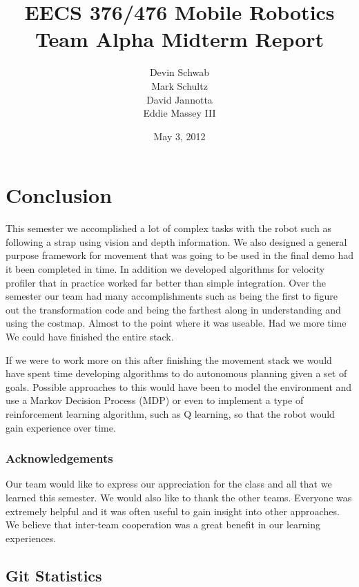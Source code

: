 \documentclass[10pt,letterpaper,draft]{report}
\author{Devin Schwab\\
  Mark Schultz\\
  David Jannotta\\
  Eddie Massey III}
\title{EECS 376/476 Mobile Robotics\\
  Team Alpha Midterm Report} \date{May 3, 2012}
\begin{document}

\listoftodos
\maketitle

\tableofcontents
\newpage









\part{Conclusion}

This semester we accomplished a lot of complex tasks with the robot such as following a strap using vision and depth information. We also designed a general purpose framework for movement that was going to be used in the final demo had it been completed in time. In addition we developed algorithms for velocity profiler that in practice worked far better than simple integration. Over the semester our team had many accomplishments such as being the first to figure out the transformation code and being the farthest along in understanding and using the costmap. Almost to the point where it was useable. Had we more time We could have finished the entire stack.

If we were to work more on this after finishing the movement stack we would have spent time developing algorithms to do autonomous planning given a set of goals. Possible approaches to this would have been to model the environment and use a Markov Decision Process (MDP) or even to implement a type of reinforcement learning algorithm, such as Q learning, so that the robot would gain experience over time.

\section{Acknowledgements}
Our team would like to express our appreciation for the class and all that we learned this semester. We would also like to thank the other teams. Everyone was extremely helpful and it was often useful to gain insight into other approaches. We believe that inter-team cooperation was a great benefit in our learning experiences.



\appendix
\chapter{Git Statistics}
\end{document}
